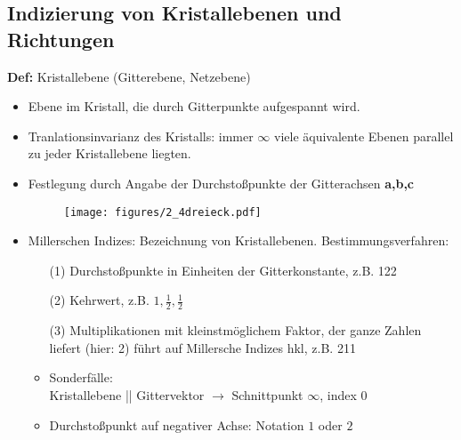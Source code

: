 \subsection{Indizierung von Kristallebenen und Richtungen}
\label{kap:2_4}
\textbf{Def:} Kristallebene (Gitterebene, Netzebene)
\begin{itemize}
    \item Ebene im Kristall, die durch Gitterpunkte aufgespannt wird.
    \item Tranlationsinvarianz des Kristalls: immer $\infty$ viele äquivalente Ebenen parallel zu jeder Kristallebene liegten.
    \item Festlegung durch Angabe der Durchstoßpunkte der Gitterachsen \textbf{a,b,c}
    \begin{figure}[H]
        \centering
        \texttt{[image: figures/2\_4dreieck.pdf]}
        \caption{}
        \label{}
    \end{figure}
    \item Millerschen Indizes: Bezeichnung von Kristallebenen. Bestimmungsverfahren:
    \begin{itemize}
        \item[(1)] Durchstoßpunkte in Einheiten der Gitterkonstante, z.B. 122
        \item[(2)] Kehrwert, z.B. $1, \frac{1}{2}, \frac{1}{2}$
        \item[(3)] Multiplikationen mit kleinstmöglichem Faktor, der ganze Zahlen liefert (hier: 2) führt auf Millersche Indizes hkl, z.B. 211
    \end{itemize}
    \begin{itemize}
        \item Sonderfälle:\\
        Kristallebene || Gittervektor $\rightarrow$ Schnittpunkt $\infty$, index 0
        \item Durchstoßpunkt auf negativer Achse: Notation $1$ oder $2$
    \end{itemize}

\end{itemize}
